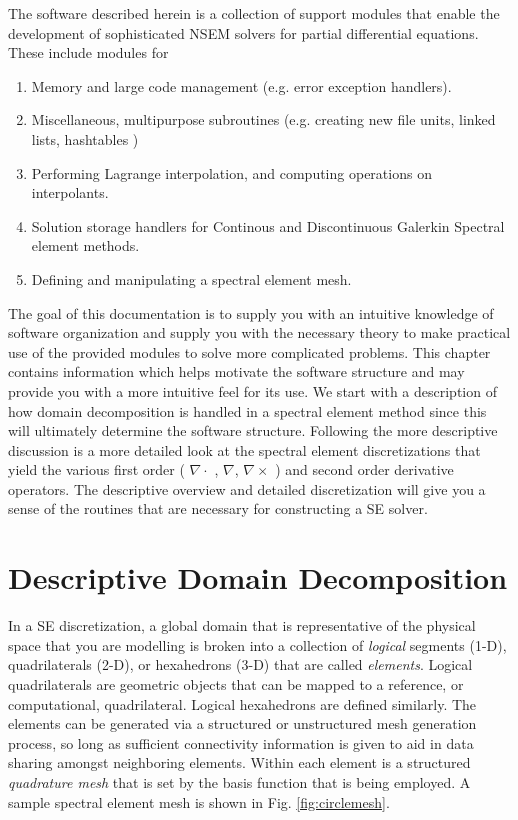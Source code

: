 \documentclass[12pt]{softwaremanual}
\begin{document}
 The software described herein is a collection of support modules that enable the development of sophisticated NSEM solvers for partial differential equations. These include modules for 
 \begin{enumerate}
 \item Memory and large code management (e.g. error exception handlers).
 \item Miscellaneous, multipurpose subroutines (e.g. creating new file units, linked lists, hashtables )
 \item Performing Lagrange interpolation, and computing operations on interpolants.
 \item Solution storage handlers for Continous and Discontinuous Galerkin Spectral element methods.
 \item Defining and manipulating a spectral element mesh.
 \end{enumerate}
 
 The goal of this documentation is to supply you with an intuitive knowledge of software organization and supply you with the necessary theory to make practical use of the provided modules to solve more complicated problems. This chapter contains information which helps motivate the software structure and may provide you with a more intuitive feel for its use. We start with a description of how domain decomposition is handled in a spectral element method since this will ultimately determine the software structure. Following the more descriptive discussion is a more detailed look at the spectral element discretizations that yield the various first order ( $\nabla \cdot$ , $\nabla$, $\nabla \times $ ) and second order derivative operators. The descriptive overview and detailed discretization will give you a sense of the routines that are necessary for constructing a SE solver.
 
\section{Descriptive Domain Decomposition}
 In a SE discretization, a global domain that is representative of the physical space that you are modelling is broken into a collection of \textit{logical} segments (1-D), quadrilaterals (2-D), or hexahedrons (3-D) that are called \textit{elements}. Logical quadrilaterals are geometric objects that can be mapped to a reference, or computational, quadrilateral. Logical hexahedrons are defined similarly. The elements can be generated via a structured or unstructured mesh generation process, so long as sufficient connectivity information is given to aid in data sharing amongst neighboring elements. Within each element is a structured \textit{quadrature mesh} that is set by the basis function that is being employed. A sample spectral element mesh is shown in Fig. \ref{fig:circlemesh}.
 
\end{document}
